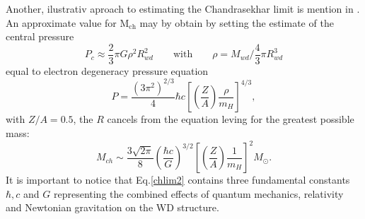 \documentclass[oneside,a4paper,11pt]{report}
\begin{document}
                                                                                                                                                                                                                                                                                                                                                                                                                                                                                                                                                                                                                                                                                                                                                                                                                                                                                                                                                                                                                                                                                                                                                                                                                                                                                                                                                                                                                                                                                                                                                                                                                                                                                                                                                                                                                                          
Another, ilustrativ aproach to estimating the Chandrasekhar limit is mention in \citet{2007ima..book.....C}. An approximate value for $\mathrm{M_{ch}}$ may by 
obtain by setting the estimate of the central pressure
\begin{equation}
 P_c \approx \frac{2}{3} \pi G \rho^2 R_{wd}^2 \qquad \text{with} \qquad \rho=M_{wd} / \frac{4}{3} \pi R_{wd}^3  
\end{equation}
equal to electron degeneracy pressure equation
\begin{equation}
 \label{edegP}
P = \frac{(3\pi^2)^{2/3}}{4} \hbar c \left[ \left( \frac{Z}{A}\right) \frac{\rho}{m_H}\right]^{4/3},
\end{equation}
with $Z/A=0.5$, the $R$ cancels from the equation leving for the greatest possible mass:
\begin{equation}
 \label{chlim2}
M_{ch} \sim \frac{3\sqrt{2\pi}}{8}\left ( \frac{\hbar c}{G} \right )^{3/2}\left [ \left ( \frac{Z}{A} \right ) \frac{1}{m_H} \right ]^2 M_\odot.  
\end{equation}
It is important to notice that Eq.\eqref{chlim2} contains three fundamental constants $\hbar, c$ and $G$ representing the combined effects of quantum mechanics, 
relativity and Newtonian gravitation on the WD structure. 
\end{document}
